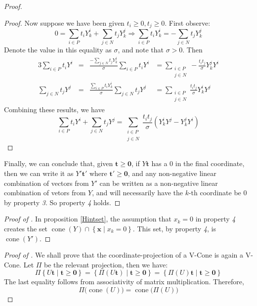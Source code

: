 \documentclass[fleqn]{article}
\renewcommand{\vec}[1]{\mathbf{#1}}
\newcommand{\set}[1]{\left\{#1\right\}}
\DeclareMathOperator{\cone}{cone}
\newcommand{\0}{\vec{0}}
\newcommand{\x}{\vec{x}}
\renewcommand{\t}{\vec{t}}
\newcommand{\st}{\;|\;}
\newcommand{\Yi}{Y^i_{k}}
\newcommand{\Yj}{Y^j_{k}}
\newcommand{\Psum}{\sum_{i\in P}}
\newcommand{\Nsum}{\sum_{j\in N}}
\newcommand{\NPsum}{\sum_{\substack{i\in P \\ j\in N}}}
\begin{document}
\begin{proof}
\begin{proof}
Now suppose we have been given $t_i \geq 0, t_j \geq 0$.  First observe:
\[ 0 = \Psum t_i\Yi + \Nsum t_j\Yj \Rightarrow \Psum t_i\Yi = -\Nsum t_j\Yj\]
Denote the value in this equality as $\sigma$, and note that $\sigma > 0$.  Then
\begin{alignat*}{3} 
\Psum t_i Y^i &= &\frac{-\Nsum t_j \Yj}{\sigma}\Psum t_i Y^i &= 
                     \NPsum -\frac{t_i t_j}{\sigma}\Yj Y^i \\
\Nsum t_j Y^j &= &\frac{\Psum t_i \Yi}{\sigma}\Nsum t_j Y^j &= 
                     \NPsum \frac{t_i t_j}{\sigma}\Yi Y^j
\end{alignat*}
Combining these results, we have
\[ \Psum t_i Y^i + \Nsum t_j Y^j = 
                     \NPsum \frac{t_i t_j}{\sigma}(\Yi Y^j - \Yj Y^i) \]
\end{proof}
Finally, we can conclude that, given $\t \geq \0$, if $ Y\t$ has a $0$ in the final coordinate, then we can write it as $ Y'\t'$ where $\t' \geq \0$, and any non-negative linear combination of vectors from $Y'$ can be written as a non-negative linear combination of vetors from $Y$, and will necessarily have the $k$-th coordinate be $0$ by property \textit{3}.  So property \textit{4} holds.
\end{proof}

\begin{proof}[Proof of {\Hint}]
In proposition \ref{Hintset}, the assumption that $x_k = 0$ in property \textit{4} creates the set $\cone(Y) \cap \set{\x \st x_k = 0}$.  This set, by property \textit{4}, is $\cone(Y')$.
\end{proof}

\begin{proof}[Proof of {\Hproj}]
  We shall prove that the coordinate-projection of a V-Cone is again a V-Cone.  Let $\Pi$ be the relevant projection, then we have:
  \[ \Pi\set{U\t \st \t \geq \0} = \set{\Pi(U\t) \st \t \geq \0} = 
        \set{\Pi(U)\t \st \t \geq \0} \]
The last equality follows from associativity of matrix multiplication.  Therefore,
  \[ \Pi\big(\cone(U)\big) = \cone\big(\Pi(U)\big) \]
\end{proof}
\end{document}
